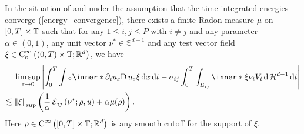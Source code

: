 \begin{proposition}
	\label{convergence_of_velocity_multiphase}
	In the situation of  and under 
	the assumption that the time-integrated energies converge 
	(\ref{energy_convergence}), there exists a finite Radon measure $ \mu $ on 
	$ [ 0 , T ] \times \operatorname{\mathbb{T}} $ such that for any $ 1 \leq i , j \leq P $ 
	with $ i \neq j $ and any parameter $ \alpha \in ( 0 , 1 ) $,  any unit 
	vector $ \nu^{ \ast } \in \mathbb{ S }^{ d - 1 } $ and any test vector 
	field $ \xi \in \operatorname{C}_{ \mathrm{c} }^{ \infty } \left( ( 0 , T ) \times 
	\operatorname{\mathbb{T}} ; \mathbb{ R }^{ d } \right) $, we have
	\begin{align*}
		& \limsup_{ \varepsilon \to 0 }
		\abs{
			\int_{ 0 }^{ T }
			\int
			\varepsilon
			\inner*{ \partial_{ t } u_{ \varepsilon } }{ \diff u_{ 
					\varepsilon } \xi }
			\dd{ x }
			\dd{ t }
			-
			\sigma_{ i j }
			\int_{ 0 }^{ T }
			\int_{ \Sigma_{ i j } }
			\inner*{ \xi }{ \nu_{ i } } V_{ i }
			\dd{ \hm^{ d - 1 } }
			\dd{ t }
		}
		\\
		\lesssim{} &
		\norm{ \xi }_{ \mathrm{sup} }
		\left(
		\frac{ 1 }{ \alpha } \tilt_excess_{ i j } \left( \nu^{ \ast } ; 
		\rho , u \right) 
		+ \alpha \mu ( \rho ) 
		\right).
	\end{align*}
	Here $ \rho \in \operatorname{C}^{ \infty } \left( [ 0 , T ] \times \operatorname{\mathbb{T}} ;  
	\mathbb{ R }^{ d } 
	\right) $ is any 
	smooth cutoff for the support of $ \xi $.
\end{proposition}

